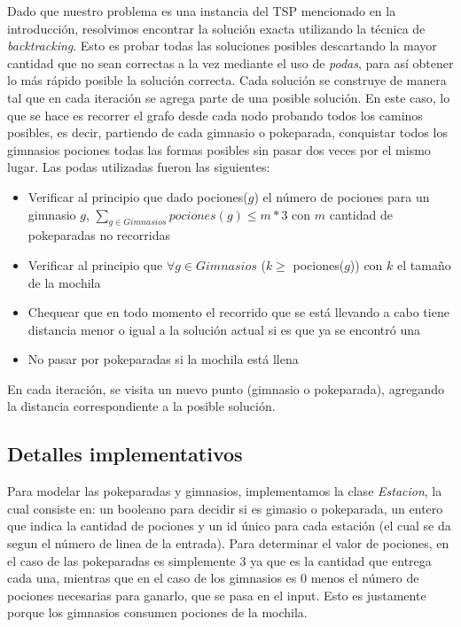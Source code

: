         Dado que nuestro problema es una instancia del TSP mencionado en la introducción, resolvimos encontrar la solución exacta utilizando la técnica de \textit{backtracking}. Esto es probar todas las soluciones posibles descartando la mayor cantidad que no sean correctas a la vez mediante el uso de \textit{podas}, para así obtener lo más rápido posible la solución correcta. Cada solución se  construye de manera tal que en cada iteración se agrega parte de una posible solución. En este caso, lo que se hace es recorrer el grafo desde cada nodo probando todos los caminos posibles, es decir, partiendo de cada gimnasio o pokeparada, conquistar todos los gimnasios pociones todas las formas posibles sin pasar dos veces por el mismo lugar. Las podas utilizadas fueron las siguientes:
            \begin{itemize}
                \item{Verificar al principio que dado pociones($g$) el número de pociones para un gimnasio $g$, \newline $\sum_{g \in Gimnasios} pociones(g) \leq m*3$ con $m$ cantidad de pokeparadas no recorridas}
                \item{Verificar al principio que $\forall g \in Gimnasios$ ($k \geq$ pociones($g$)) con $k$ el tamaño de la mochila}
                \item{Chequear que en todo momento el recorrido que se está llevando a cabo tiene distancia menor o igual a la solución actual si es que ya se encontró una}
                \item{No pasar por pokeparadas si la mochila está llena}
            \end{itemize}

        En cada iteración, se visita un nuevo punto (gimnasio o pokeparada), agregando la distancia correspondiente a la posible solución.


        \subsection{Detalles implementativos}
            Para modelar las pokeparadas y gimnasios, implementamos la clase \textit{Estacion}, la cual consiste en: un booleano para decidir si es gimasio o pokeparada, un entero que indica la cantidad de pociones y un id único para cada estación (el cual se da segun el número de linea de la entrada). Para determinar el valor de pociones, en el caso de las pokeparadas es simplemente 3 ya que es la cantidad que entrega cada una, mientras que en el caso de los gimnasios es 0 menos el número de pociones necesarias para ganarlo, que se pasa en el input. Esto es justamente porque los gimnasios consumen pociones de la mochila.

